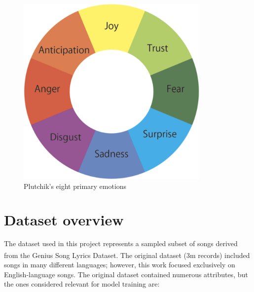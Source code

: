 \begin{figure}[H]
    \centering
    \includegraphics[scale= 0.5]{pictures/plutchik_primary_emotions.png}
    \caption{Plutchik's eight primary emotions}
    \label{fig:primary_emotions}
\end{figure}




\section*{Dataset overview}
The dataset used in this project represents a sampled subset of songs
derived from the Genius Song Lyrics Dataset\textsuperscript{\cite{geniusdataset}}.
The original dataset (3m records) included songs in many different languages; however, this work focused
exclusively on English-language songs.
The original dataset contained numerous attributes, but the ones considered relevant
for model training are:

